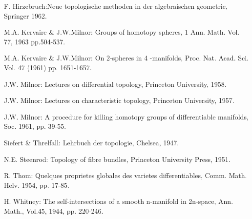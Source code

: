 \begin{thebibliography}{99}
 {F. Hirzebruch}:\pageoriginale Neue topologische methoden in der
  algebraischen geometrie, Springer 1962. 

 {M.A. Kervaire \& J.W.Milnor}: Groups of homotopy spheres,
  1 Ann. Math. Vol. 77, 1963 pp.504-537. 

 {M.A. Kervaire \& J.W.Milnor}: On 2-spheres in 4
  -manifolds, Proc. Nat. Acad. Sci. Vol. 47 (1961) pp. 1651-1657. 

 {J.W. Milnor}: Lectures on differential topology, Princeton
  University, 1958. 

 {J.W. Milnor}: Lectures on characteristic topology,
  Princeton University, 1957. 

 {J.W. Milnor}: A procedure for killing homotopy groups of
  differentiable manifolds, Soc. 1961, pp. 39-55. 

 {Siefert \& Threlfall}: Lehrbuch der topologie, Chelsea,
  1947. 

 {N.E. Steenrod}: Topology of fibre bundles, Princeton
  University Press, 1951.
 
 {R. Thom}: Quelques proprietes globales des varietes
  differentiables, Comm. Math. Helv. 1954, pp. 17-85.
 
 {H. Whitney}: The self-intersections of a smooth
  n-manifold in 2n-space, Ann. Math., Vol.45, 1944, pp. 220-246. 
\end{thebibliography}

